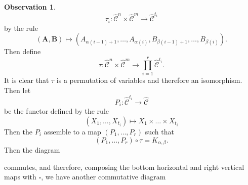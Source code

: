 \documentclass[a4paper]{article}
\numberwithin{equation}{subsection}
\theoremstyle{plain}   %
\theoremstyle{definition}
\newtheorem{obs}[equation]{Observation}
\theoremstyle{remark}
\theoremstyle{plain}
\DeclareMathOperator{\id}{id}
\newcommand{\overcat}[2]{{\left(#1\downarrow #2\right)}}
\newcommand{\psh}[1]{\ensuremath{\widehat{#1}}}
\providecommand{\C}{}
\renewcommand{\C}{\ensuremath{\mathcal{C}}}
\newcommand{\cellset}{\ensuremath{\widehat{\Theta[\mathcal{C}]}}}
\newcommand{\ssetlab}{\ensuremath{\widehat{\Delta} \int \widehat{\mathcal{C}}}}
\begin{document}
\begin{obs}
	\[\tau_i:\psh{\C}^n \times \psh{\C}^m \to \psh{\C}^{t_i}\] by the rule
	\[(\mathbf{A},\mathbf{B})\mapsto (A_{\alpha(i-1)+1}, \dots, A_{\alpha(i)}, B_{\beta(i-1)+1},\dots, B_{\beta(i)}).\]
	Then define \[\tau:\psh{\C}^n \times \psh{\C}^m \to \prod_{i=1}^r \psh{\C}^{t_i}.\]
	It is clear that \(\tau\) is a permutation of variables and therefore an isomorphism.
	Then let \[P_i: \psh{\C}^{t_i} \to \psh{\C}\] be the functor defined by the rule
	\[(X_1,\dots,X_{t_i}) \mapsto X_1 \times \dots \times X_{t_i}\]
	Then the \(P_i\) assemble to a map \((P_1, \dots, P_r)\) such that \[(P_1,\dots,P_r)\circ \tau = K_{\alpha,\beta}.\]
	Then the diagram
	\begin{center}
	\end{center}
	commutes, and therefore, composing the bottom horizontal and right vertical maps with \(\square\), we have another commutative diagram
	\begin{center}
\end{center}
\end{obs}
\end{document}
